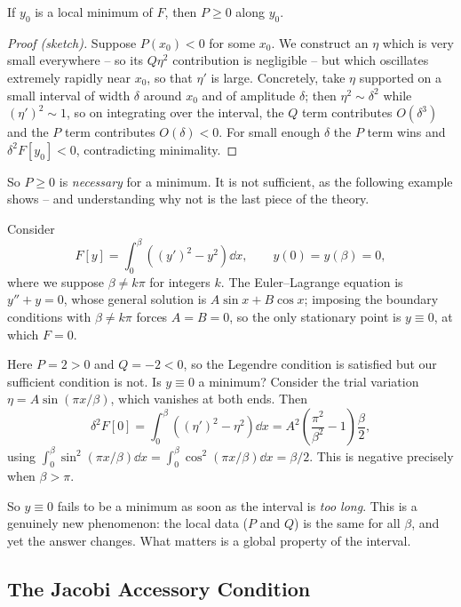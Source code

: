 \documentclass[a4paper]{scrartcl}
\begin{document}
\begin{proposition}
	If $y_0$ is a local minimum of $F$, then $P \geq 0$ along $y_0$.
\end{proposition}
\begin{proof}[Proof (sketch)]
	Suppose $P(x_0) < 0$ for some $x_0$. We construct an $\eta$ which is very small everywhere -- so its $Q\eta^2$ contribution is negligible -- but which oscillates extremely rapidly near $x_0$, so that $\eta'$ is large. Concretely, take $\eta$ supported on a small interval of width $\delta$ around $x_0$ and of amplitude $\delta$; then $\eta^2 \sim \delta^2$ while $(\eta')^2 \sim 1$, so on integrating over the interval, the $Q$ term contributes $O(\delta^3)$ and the $P$ term contributes $O(\delta) < 0$. For small enough $\delta$ the $P$ term wins and $\delta^2 F[y_0] < 0$, contradicting minimality.
\end{proof}

So $P \geq 0$ is \emph{necessary} for a minimum. It is not sufficient, as the following example shows -- and understanding why not is the last piece of the theory.

\begin{example}\label{eg:toolong}
	Consider
	$$
	F[y] = \int_0^\beta\left((y')^2 - y^2\right)\dd x, \qquad y(0) = y(\beta) = 0,
	$$
	where we suppose $\beta \neq k\pi$ for integers $k$. The Euler--Lagrange equation is $y'' + y = 0$, whose general solution is $A\sin x + B\cos x$; imposing the boundary conditions with $\beta\neq k\pi$ forces $A = B = 0$, so the only stationary point is $y \equiv 0$, at which $F = 0$.

	Here $P = 2 > 0$ and $Q = -2 < 0$, so the Legendre condition is satisfied but our sufficient condition is not. Is $y \equiv 0$ a minimum? Consider the trial variation $\eta = A\sin(\pi x/\beta)$, which vanishes at both ends. Then
	$$
	\delta^2 F[0] = \int_0^\beta\left((\eta')^2 - \eta^2\right)\dd x = A^2\left(\frac{\pi^2}{\beta^2} - 1\right)\frac{\beta}{2},
	$$
	using $\int_0^\beta \sin^2(\pi x/\beta)\dd x = \int_0^\beta\cos^2(\pi x/\beta)\dd x = \beta/2$. This is negative precisely when $\beta > \pi$.

	So $y \equiv 0$ fails to be a minimum as soon as the interval is \emph{too long}. This is a genuinely new phenomenon: the local data ($P$ and $Q$) is the same for all $\beta$, and yet the answer changes. What matters is a global property of the interval.
\end{example}

\subsection{The Jacobi Accessory Condition}
\end{document}
